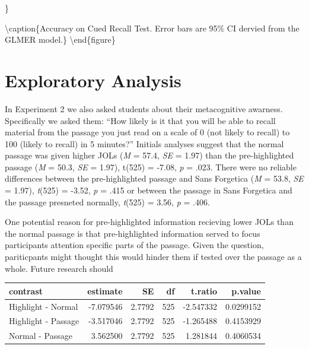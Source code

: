 \documentclass[pdf]{apa6}
\begin{document}
\}

\textbackslash{}caption\{Accuracy on Cued Recall Test. Error bars are 95\% CI dervied from the GLMER model.\}\label{fig:unnamed-chunk-2}
\textbackslash{}end\{figure\}

\hypertarget{exploratory-analysis}{%
\section{Exploratory Analysis}\label{exploratory-analysis}}

In Experiment 2 we also asked students about their metacognitive awarness. Specifically we asked them: \enquote{How likely is it that you will be able to recall material from the passage you just read on a scale of 0 (not likely to recall) to 100 (likely to recall) in 5 minutes?} Initials analyses suggest that the normal passage was given higher JOLs (\emph{M} = 57.4, \emph{SE} = 1.97) than the pre-highlighted passage (\emph{M} = 50.3, \emph{SE} = 1.97), t(525) = -7.08, \emph{p} = .023. There were no reliable differences between the pre-highlighted passage and Sans Forgetica (\emph{M} = 53.8, \emph{SE} = 1.97), \emph{t}(525) = -3.52, \emph{p} = .415 or between the passage in Sans Forgetica and the passage presneted normally, \emph{t}(525) = 3.56, \emph{p} = .406.

One potential reason for pre-highlighted information recieving lower JOLs than the normal passage is that pre-highlighted information served to focus participants attention specific parts of the passage. Given the question, pariticpants might thought this would hinder them if tested over the passage as a whole. Future research should

\begin{tabular}{l|r|r|r|r|r}
\hline
contrast & estimate & SE & df & t.ratio & p.value\\
\hline
Highlight - Normal & -7.079546 & 2.7792 & 525 & -2.547332 & 0.0299152\\
\hline
Highlight - Passage & -3.517046 & 2.7792 & 525 & -1.265488 & 0.4153929\\
\hline
Normal - Passage & 3.562500 & 2.7792 & 525 & 1.281844 & 0.4060534\\
\hline
\end{tabular}
\end{document}
